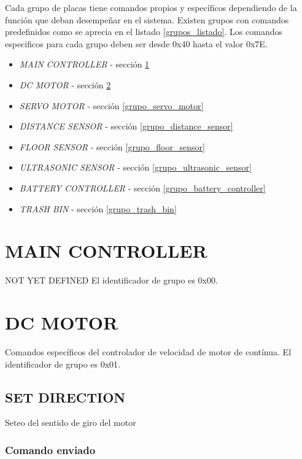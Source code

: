 \documentclass[a4paper,11pt]{article}
\begin{document}
Cada grupo de placas tiene comandos propios y espec\'ificos dependiendo de la funci\'on que deban desempe\~nar en el sistema.
Existen grupos con comandos predefinidos como se aprecia en el listado \ref{grupos_listado}.
Los comandos especificos para cada grupo deben ser desde 0x40 hasta el valor 0x7E.

\begin{itemize}
	\item \emph{MAIN CONTROLLER} - secci\'on \ref{grupo_main_controller}
	\item \emph{DC MOTOR} - secci\'on \ref{grupo_dc_motor}
	\item \emph{SERVO MOTOR} - secci\'on \ref{grupo_servo_motor}
	\item \emph{DISTANCE SENSOR} - secci\'on \ref{grupo_distance_sensor}
	\item \emph{FLOOR SENSOR} - secci\'on \ref{grupo_floor_sensor}
	\item \emph{ULTRASONIC SENSOR} - secci\'on \ref{grupo_ultrasonic_sensor}
	\item \emph{BATTERY CONTROLLER} - secci\'on \ref{grupo_battery_controller}
	\item \emph{TRASH BIN} - secci\'on \ref{grupo_trash_bin}
\label{grupos_listado}
\end{itemize}

\section{MAIN CONTROLLER}
\label{grupo_main_controller}

NOT YET DEFINED
El identificador de grupo es 0x00.

\section{DC MOTOR}
\label{grupo_dc_motor}

Comandos espec\'ificos del controlador de velocidad de motor de cont\'inua.
El identificador de grupo es 0x01.

\subsection{SET DIRECTION}
\label{direction}

Seteo del sentido de giro del motor

\subsubsection*{Comando enviado}
\label{direction_comando_enviado}
\end{document}
